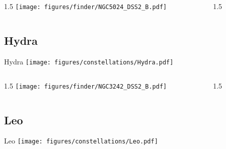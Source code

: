 \documentclass[final]{beamer}
\newlength{\colwidth}
\begin{document}

\begin{frame}[t]{}
  \begin{columns}[T]
    \begin{column}{1.5\colwidth}
      \centering
      \texttt{[image: figures/finder/NGC5024\_DSS2\_B.pdf]}
    \end{column}
    \begin{column}{1.5\colwidth}
      \Large
      
    \end{column}
  \end{columns}
  \vspace{\fill}
\end{frame}

\subsection{Hydra}

\begin{frame}[t]{\LARGE Hydra}
  \centering
  \texttt{[image: figures/constellations/Hydra.pdf]}
\end{frame}


\begin{frame}[t]{}
  \begin{columns}[T]
    \begin{column}{1.5\colwidth}
      \centering
      \texttt{[image: figures/finder/NGC3242\_DSS2\_B.pdf]}
    \end{column}
    \begin{column}{1.5\colwidth}
      \Large
      
    \end{column}
  \end{columns}
  \vspace{\fill}
\end{frame}

\subsection{Leo}

\begin{frame}[t]{\LARGE Leo}
  \centering
  \texttt{[image: figures/constellations/Leo.pdf]}
\end{frame}
\end{document}
